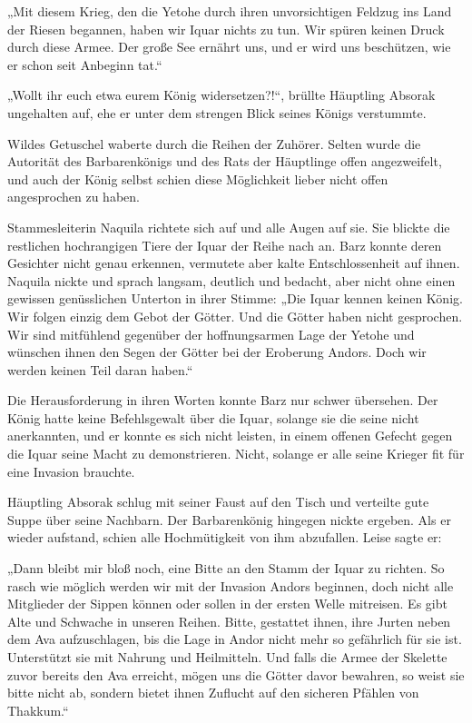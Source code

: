 „Mit diesem Krieg, den die Yetohe durch ihren unvorsichtigen Feldzug ins Land der Riesen begannen, haben wir Iquar nichts zu tun. Wir spüren keinen Druck durch diese Armee. Der große See ernährt uns, und er wird uns beschützen, wie er schon seit Anbeginn tat.“

„Wollt ihr euch etwa eurem König widersetzen?!“, brüllte Häuptling Absorak ungehalten auf, ehe er unter dem strengen Blick seines Königs verstummte.

Wildes Getuschel waberte durch die Reihen der Zuhörer. Selten wurde die Autorität des Barbarenkönigs und des Rats der Häuptlinge offen angezweifelt, und auch der König selbst schien diese Möglichkeit lieber nicht offen angesprochen zu haben.

Stammesleiterin Naquila richtete sich auf und alle Augen auf sie. Sie blickte die restlichen hochrangigen Tiere der Iquar der Reihe nach an. Barz konnte deren Gesichter nicht genau erkennen, vermutete aber kalte Entschlossenheit auf ihnen. Naquila nickte und sprach langsam, deutlich und bedacht, aber nicht ohne einen gewissen genüsslichen Unterton in ihrer Stimme: „Die Iquar kennen keinen König. Wir folgen einzig dem Gebot der Götter. Und die Götter haben nicht gesprochen. Wir sind mitfühlend gegenüber der hoffnungsarmen Lage der Yetohe und wünschen ihnen den Segen der Götter bei der Eroberung Andors. Doch wir werden keinen Teil daran haben.“

Die Herausforderung in ihren Worten konnte Barz nur schwer übersehen. Der König hatte keine Befehlsgewalt über die Iquar, solange sie die seine nicht anerkannten, und er konnte es sich nicht leisten, in einem offenen Gefecht gegen die Iquar seine Macht zu demonstrieren. Nicht, solange er alle seine Krieger fit für eine Invasion brauchte.

Häuptling Absorak schlug mit seiner Faust auf den Tisch und verteilte gute Suppe über seine Nachbarn. Der Barbarenkönig hingegen nickte ergeben. Als er wieder aufstand, schien alle Hochmütigkeit von ihm abzufallen. Leise sagte er:

„Dann bleibt mir bloß noch, eine Bitte an den Stamm der Iquar zu richten. So rasch wie möglich werden wir mit der Invasion Andors beginnen, doch nicht alle Mitglieder der Sippen können oder sollen in der ersten Welle mitreisen. Es gibt Alte und Schwache in unseren Reihen. Bitte, gestattet ihnen, ihre Jurten neben dem Ava aufzuschlagen, bis die Lage in Andor nicht mehr so gefährlich für sie ist. Unterstützt sie mit Nahrung und Heilmitteln. Und falls die Armee der Skelette zuvor bereits den Ava erreicht, mögen uns die Götter davor bewahren, so weist sie bitte nicht ab, sondern bietet ihnen Zuflucht auf den sicheren Pfählen von Thakkum.“


